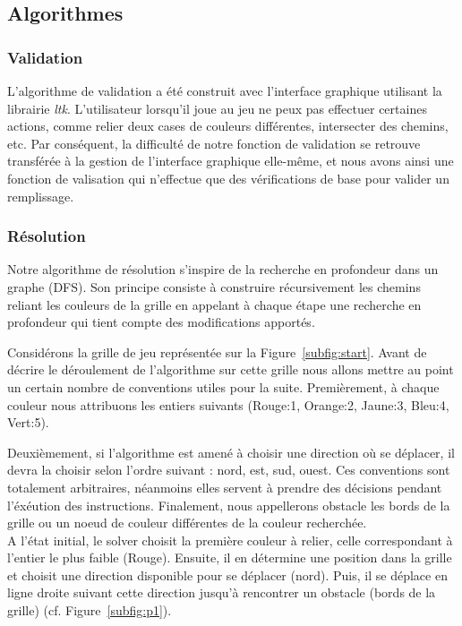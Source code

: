\subsection{Algorithmes}
\subsubsection{Validation}


L'algorithme de validation a été construit avec l'interface graphique utilisant la librairie \textit{ltk}. L'utilisateur lorsqu'il joue au jeu ne peux pas effectuer certaines actions, comme relier deux cases de couleurs différentes, intersecter des chemins, etc. Par conséquent, la difficulté de notre fonction de validation se retrouve transférée à la gestion de l'interface graphique elle-même, et nous avons ainsi une fonction de valisation qui n'effectue que des vérifications de base pour valider un remplissage.

\subsubsection{Résolution}
Notre algorithme de résolution s'inspire de la recherche en profondeur dans un graphe (DFS). Son principe consiste à construire récursivement les chemins reliant les couleurs de la grille en appelant à chaque étape une recherche en profondeur qui tient compte des modifications apportés.

Considérons la grille de jeu représentée sur la Figure~\vref{subfig:start}. Avant de décrire le déroulement de l'algorithme sur cette grille nous allons mettre au point un certain nombre de conventions utiles pour la suite. Premièrement, à chaque couleur nous attribuons les entiers suivants (Rouge:1, Orange:2, Jaune:3, Bleu:4, Vert:5).

Deuxièmement, si l'algorithme est amené à choisir une direction où se déplacer, il devra la choisir selon l'ordre suivant : nord, est, sud, ouest. Ces conventions sont totalement arbitraires, néanmoins elles servent à prendre des décisions pendant l'éxéution des instructions. Finalement, nous appellerons obstacle les bords de la grille ou un noeud de couleur différentes de la couleur recherchée.\\

A l'état initial, le solver choisit la première couleur à relier, celle correspondant à l'entier le plus faible (Rouge). Ensuite, il en détermine une position dans la grille et choisit une direction disponible pour se déplacer (nord). Puis, il se déplace en ligne droite  suivant cette direction jusqu'à rencontrer un obstacle (bords de la grille) (cf. Figure~\vref{subfig:p1}).

